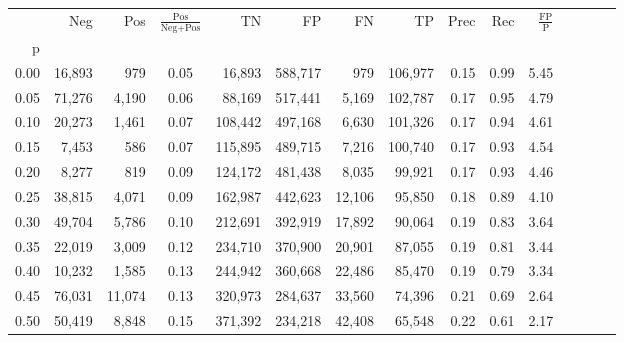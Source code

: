 \begin{tabular}{rrrcrrrrrrrrrrr}
\toprule
{} &     Neg &     Pos & $\frac{\text{Pos}}{\text{Neg}+\text{Pos}}$ &       TN &       FP &       FN &       TP &  Prec &   Rec & $\frac{\text{FP}}{\text{P}}$ \\
p    &         &         &                                            &          &          &          &          &       &       &                              \\
\midrule
0.00 &  16,893 &     979 &                                       0.05 &   16,893 &  588,717 &      979 &  106,977 &  0.15 &  0.99 &                         5.45 \\
0.05 &  71,276 &   4,190 &                                       0.06 &   88,169 &  517,441 &    5,169 &  102,787 &  0.17 &  0.95 &                         4.79 \\
0.10 &  20,273 &   1,461 &                                       0.07 &  108,442 &  497,168 &    6,630 &  101,326 &  0.17 &  0.94 &                         4.61 \\
0.15 &   7,453 &     586 &                                       0.07 &  115,895 &  489,715 &    7,216 &  100,740 &  0.17 &  0.93 &                         4.54 \\
0.20 &   8,277 &     819 &                                       0.09 &  124,172 &  481,438 &    8,035 &   99,921 &  0.17 &  0.93 &                         4.46 \\
0.25 &  38,815 &   4,071 &                                       0.09 &  162,987 &  442,623 &   12,106 &   95,850 &  0.18 &  0.89 &                         4.10 \\
0.30 &  49,704 &   5,786 &                                       0.10 &  212,691 &  392,919 &   17,892 &   90,064 &  0.19 &  0.83 &                         3.64 \\
0.35 &  22,019 &   3,009 &                                       0.12 &  234,710 &  370,900 &   20,901 &   87,055 &  0.19 &  0.81 &                         3.44 \\
0.40 &  10,232 &   1,585 &                                       0.13 &  244,942 &  360,668 &   22,486 &   85,470 &  0.19 &  0.79 &                         3.34 \\
0.45 &  76,031 &  11,074 &                                       0.13 &  320,973 &  284,637 &   33,560 &   74,396 &  0.21 &  0.69 &                         2.64 \\
0.50 &  50,419 &   8,848 &                                       0.15 &  371,392 &  234,218 &   42,408 &   65,548 &  0.22 &  0.61 &                         2.17 \\

\end{tabular}
